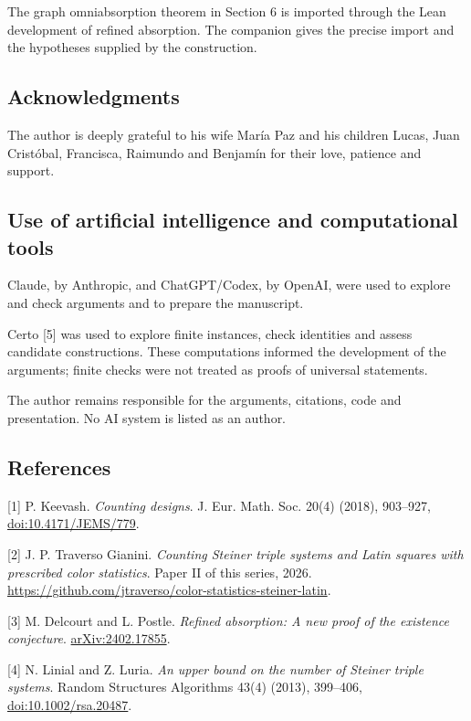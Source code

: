 \documentclass[english,11pt,a4paper]{article}
\begin{document}
The graph omniabsorption theorem in Section 6 is imported through the Lean development of refined absorption. The companion gives the precise import and the hypotheses supplied by the construction.

\subsection{Acknowledgments}\label{acknowledgments}

The author is deeply grateful to his wife María Paz and his children Lucas, Juan Cristóbal, Francisca, Raimundo and Benjamín for their love, patience and support.

\subsection{Use of artificial intelligence and computational tools}\label{use-of-artificial-intelligence-and-computational-tools}

Claude, by Anthropic, and ChatGPT/Codex, by OpenAI, were used to explore and check arguments and to prepare the manuscript.

Certo {[}5{]} was used to explore finite instances, check identities and assess candidate constructions. These computations informed the development of the arguments; finite checks were not treated as proofs of universal statements.

The author remains responsible for the arguments, citations, code and presentation. No AI system is listed as an author.

\subsection{References}\label{references}
\raggedright

{[}1{]} P. Keevash. \emph{Counting designs}. J. Eur. Math. Soc. 20(4) (2018), 903--927, \href{https://doi.org/10.4171/JEMS/779}{doi:10.4171/JEMS/779}.

{[}2{]} J. P. Traverso Gianini. \emph{Counting Steiner triple systems and Latin squares with prescribed color statistics}. Paper II of this series, 2026. \url{https://github.com/jtraverso/color-statistics-steiner-latin}.

{[}3{]} M. Delcourt and L. Postle. \emph{Refined absorption: A new proof of the existence conjecture}. \href{https://arxiv.org/abs/2402.17855}{arXiv:2402.17855}.

{[}4{]} N. Linial and Z. Luria. \emph{An upper bound on the number of Steiner triple systems}. Random Structures Algorithms 43(4) (2013), 399--406, \href{https://doi.org/10.1002/rsa.20487}{doi:10.1002/rsa.20487}.
\end{document}

